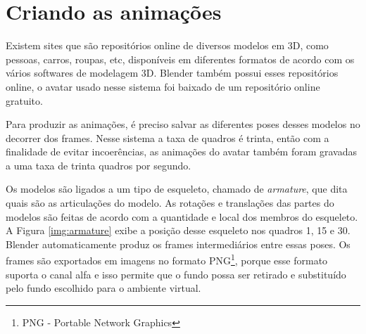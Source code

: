 \section{Criando as animações}

Existem sites que são repositórios online de diversos modelos em 3D, como pessoas, carros, roupas, etc, disponíveis em diferentes formatos de acordo com os vários softwares de modelagem 3D. Blender também possui esses repositórios online, o avatar usado nesse sistema foi baixado de um repositório online gratuito.

Para produzir as animações, é preciso salvar as diferentes poses desses modelos no decorrer dos frames. Nesse sistema a taxa de quadros é trinta, então com a finalidade de evitar incoerências, as animações do avatar também foram gravadas a uma taxa de trinta quadros por segundo.

Os modelos são ligados a um tipo de esqueleto, chamado de \textit{armature}, que dita quais são as articulações do modelo. As rotações e translações das partes do modelos são feitas de acordo com a quantidade e local dos membros do esqueleto. A Figura \ref{img:armature} exibe a posição desse esqueleto nos quadros 1, 15 e 30. Blender automaticamente produz os frames intermediários entre essas poses. Os frames são exportados em imagens no formato PNG\footnote{PNG - Portable Network Graphics}, porque esse formato suporta o canal alfa e isso permite que o fundo possa ser retirado e substituído pelo fundo escolhido para o ambiente virtual.

